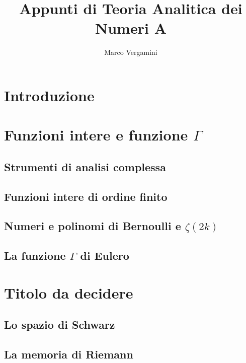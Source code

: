 \documentclass{article}
\title{Appunti di Teoria Analitica dei Numeri A}
\date{}
\author{Marco Vergamini}
\begin{document}
\maketitle
\newpage
\tableofcontents
\newpage


\section*{Introduzione}


\newpage

\section{Funzioni intere e funzione $\Gamma$}

\subsection{Strumenti di analisi complessa}


\subsection{Funzioni intere di ordine finito}


\subsection{Numeri e polinomi di Bernoulli e $\zeta(2k)$}


\subsection{La funzione $\Gamma$ di Eulero}


\newpage

\section{Titolo da decidere}

\subsection{Lo spazio di Schwarz}


\subsection{La memoria di Riemann}

\end{document}
